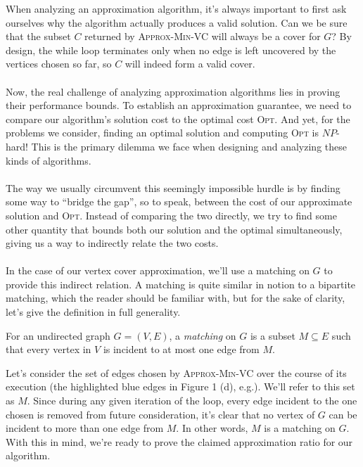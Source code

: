 \documentclass{article}
\newenvironment{definition}[2][Definition]{\begin{trivlist}
\item[\hskip \labelsep {\bfseries #1}\hskip \labelsep {\hspace{-1ex}\bfseries #2.}]}{\end{trivlist}}
\begin{document}
\noindent When analyzing an approximation algorithm, it's always important to first ask ourselves why the algorithm actually produces a valid solution. Can we be sure that the subset $C$ returned by \textsc{Approx-Min-VC} will always be a cover for $G$? By design, the while loop terminates only when no edge is left uncovered by the vertices chosen so far, so $C$ will indeed form a valid cover.\\
\\
Now, the real challenge of analyzing approximation algorithms lies in proving their performance bounds. To establish an approximation guarantee, we need to compare our algorithm's solution cost to the optimal cost \textsc{Opt}. And yet, for the problems we consider, finding an optimal solution and computing \textsc{Opt} is $NP$-hard! This is the primary dilemma we face when designing and analyzing these kinds of algorithms.\\
\\
The way we usually circumvent this seemingly impossible hurdle is by finding some way to ``bridge the gap'', so to speak, between the cost of our approximate solution and \textsc{Opt}. Instead of comparing the two directly, we try to find some other quantity that bounds both our solution and the optimal simultaneously, giving us a way to indirectly relate the two costs.\\
\\
In the case of our vertex cover approximation, we'll use a matching on $G$ to provide this indirect relation. A matching is quite similar in notion to a bipartite matching, which the reader should be familiar with, but for the sake of clarity, let's give the definition in full generality.

\begin{definition}{ (Matching)}{}
    For an undirected graph $G = (V,E)$, a \textit{matching} on $G$ is a subset $M \subseteq E$ such that every vertex in $V$ is incident to at most one edge from $M$.
\end{definition}

\noindent Let's consider the set of edges chosen by \textsc{Approx-Min-VC} over the course of its execution (the highlighted blue edges in Figure 1 (d), e.g.). We'll refer to this set as $M$. Since during any given iteration of the loop, every edge incident to the one chosen is removed from future consideration, it's clear that no vertex of $G$ can be incident to more than one edge from $M$. In other words, $M$ is a matching on $G$. With this in mind, we're ready to prove the claimed approximation ratio for our algorithm.
\end{document}
